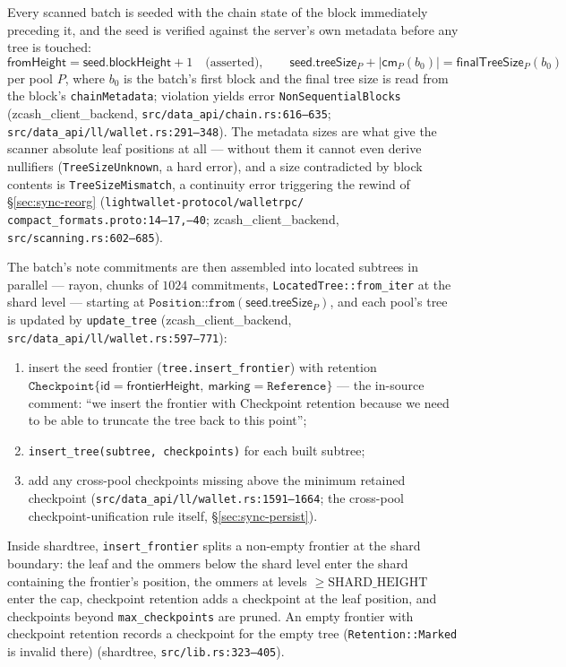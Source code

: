 \documentclass[11pt,a4paper]{article}
\theoremstyle{definition}
\begin{document}
Every scanned batch is seeded with the chain state of the block
immediately preceding it, and the seed is verified against the server's
own metadata before any tree is touched:
\[
\mathsf{fromHeight} = \mathsf{seed}.\mathsf{blockHeight} + 1
\quad\text{(asserted)}, \qquad
\mathsf{seed}.\mathsf{treeSize}_P + |\mathsf{cm}_P(b_0)| =
\mathsf{finalTreeSize}_P(b_0)
\]
per pool $P$, where $b_0$ is the batch's first block and the final
tree size is read from the block's \texttt{chainMetadata}; violation
yields error \texttt{NonSequentialBlocks}
(\textsf{zcash\_client\_backend},
\texttt{src/data\_api/chain.rs:616--635};
\texttt{src/data\_api/ll/wallet.rs:291--348}). The metadata sizes are
what give the scanner absolute leaf positions at all --- without them it
cannot even derive nullifiers (\texttt{TreeSizeUnknown}, a hard error),
and a size contradicted by block contents is \texttt{TreeSizeMismatch},
a continuity error triggering the rewind of \S\ref{sec:sync-reorg}
(\texttt{lightwallet-protocol/walletrpc/}\allowbreak
\texttt{compact\_formats.proto:14--17,--40};
\textsf{zcash\_client\_backend},
\texttt{src/scanning.rs:602--685}).

The batch's note commitments are then assembled into located subtrees in
parallel --- \textsf{rayon}, chunks of $1024$ commitments,
\texttt{LocatedTree::from\_iter} at the shard level --- starting at
$\texttt{Position::from}(\mathsf{seed}.\mathsf{treeSize}_P)$, and each
pool's tree is updated by \texttt{update\_tree}
(\textsf{zcash\_client\_backend},
\texttt{src/data\_api/ll/}\allowbreak\texttt{wallet.rs:597--771}):
\begin{enumerate}[label=(\arabic*)]
\item insert the seed frontier (\texttt{tree.insert\_frontier}) with
  retention
  $\texttt{Checkpoint}\{\mathsf{id} = \mathsf{frontierHeight},\
  \mathsf{marking} = \texttt{Reference}\}$ --- the in-source comment:
  ``we insert the frontier with Checkpoint retention because we need to
  be able to truncate the tree back to this point'';
\item \texttt{insert\_tree(subtree, checkpoints)} for each built
  subtree;
\item add any cross-pool checkpoints missing above the minimum retained
  checkpoint
  (\texttt{src/data\_api/ll/wallet.rs:1591--1664}; the cross-pool
  checkpoint-unification rule itself, \S\ref{sec:sync-persist}).
\end{enumerate}
Inside \textsf{shardtree}, \texttt{insert\_frontier} splits a non-empty
frontier at the shard boundary: the leaf and the ommers below the shard
level enter the shard containing the frontier's position, the ommers at
levels $\ge \mathrm{SHARD\_HEIGHT}$ enter the cap, checkpoint retention
adds a checkpoint at the leaf position, and checkpoints beyond
\texttt{max\_checkpoints} are pruned. An empty frontier with checkpoint
retention records a checkpoint for the empty tree
(\texttt{Retention::Marked} is invalid there)
(\textsf{shardtree}, \texttt{src/lib.rs:323--405}).
\end{document}

